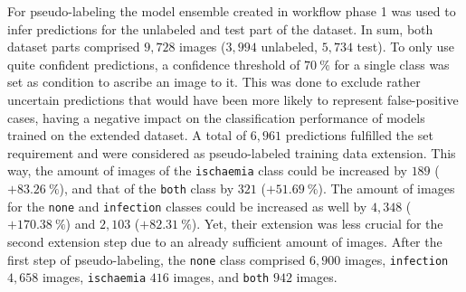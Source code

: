 \documentclass[runningheads]{llncs}
\begin{document}
For pseudo-labeling the model ensemble created in workflow phase 1 was used to infer predictions for the unlabeled and test part of the dataset. In sum, both dataset parts comprised $9,728$ images ($3,994$ unlabeled, $5,734$ test). To only use quite confident predictions, a confidence threshold of $70~\%$ for a single class was set as condition to ascribe an image to it. This was done to exclude rather uncertain predictions that would have been more likely to represent false-positive cases, having a negative impact on the classification performance of models trained on the extended dataset. 
A total of $6,961$ predictions fulfilled the set requirement and were considered as pseudo-labeled training data extension. This way, the amount of images of the \texttt{ischaemia} class could be increased by $189$ ($+83.26~\%$), and that of the \texttt{both} class by $321$ ($+51.69~\%$). The amount of images for the \texttt{none} and \texttt{infection} classes could be increased as well by $4,348$ ($+170.38~\%$) and $2,103$ ($+82.31~\%$). Yet, their extension was less crucial for the second extension step due to an already sufficient amount of images. After the first step of pseudo-labeling, the \texttt{none} class comprised $6,900$ images, \texttt{infection} $4,658$ images, \texttt{ischaemia} $416$ images, and \texttt{both} $942$ images.
\end{document}
